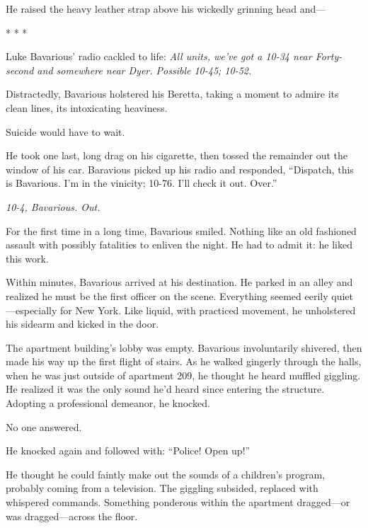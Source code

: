 He raised the heavy leather strap above his wickedly grinning head
and---



* * *



Luke Bavarious' radio cackled to life: {\em All units, we've got a
10-34 near Forty-second and somewhere near Dyer. Possible 10-45;
10-52.}



Distractedly, Bavarious holstered his Beretta, taking a moment to
admire its clean lines, its intoxicating heaviness.



Suicide would have to wait.



He took one last, long drag on his cigarette, then tossed the
remainder out the window of his car. Baravious picked up his radio
and responded, ``Dispatch, this is Bavarious. I'm in the vinicity;
10-76. I'll check it out. Over.''



{\em 10-4, Bavarious. Out.}



For the first time in a long time, Bavarious smiled. Nothing like
an old fashioned assault with possibly fatalities to enliven the
night. He had to admit it: he liked this work.



Within minutes, Bavarious arrived at his destination. He parked in
an alley and realized he must be the first officer on the scene.
Everything seemed eerily quiet---especially for New York. Like
liquid, with practiced movement, he unholstered his sidearm and
kicked in the door.



The apartment building's lobby was empty. Bavarious involuntarily
shivered, then made his way up the first flight of stairs. As he
walked gingerly through the halls, when he was just outside of
apartment 209, he thought he heard muffled giggling. He realized it
was the only sound he'd heard since entering the structure.
Adopting a professional demeanor, he knocked.



No one answered.



He knocked again and followed with: ``Police! Open up!''



He thought he could faintly make out the sounds of a children's
program, probably coming from a television. The giggling subsided,
replaced with whispered commands. Something ponderous within the
apartment dragged---or was dragged---across the
floor.



